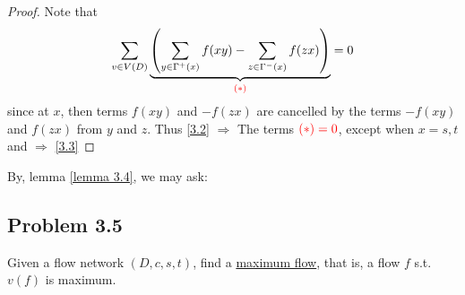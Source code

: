 \begin{proof}
    Note that 
    \begin{align*}
        \sum\limits_{v\in V(D)} \underbrace{\left( \sum\limits_{y\in\Gamma^+(x)} f(xy) - \sum\limits_{z\in\Gamma^-(x)}f(zx) \right) }\limits_{\color{red}{(*)}}= 0
    \end{align*}
    since at $x$, then terms $f(xy)$ and $-f(zx)$ are cancelled by the terms $-f(xy)$ and $f(zx)$ from $y$ and $z$. Thus \ref{3.2} $\Longrightarrow$ The terms $\color{red}{(*)} = 0$, except when $x = s,t$ and $\Longrightarrow$ \ref{3.3}
\end{proof}

By, lemma \ref{lemma 3.4}, we may ask:

\subsection{Problem 3.5} Given a flow network $(D, c, s, t)$, find a \uline{maximum flow}, that is, a flow $f$ s.t. $v(f)$ is maximum.

